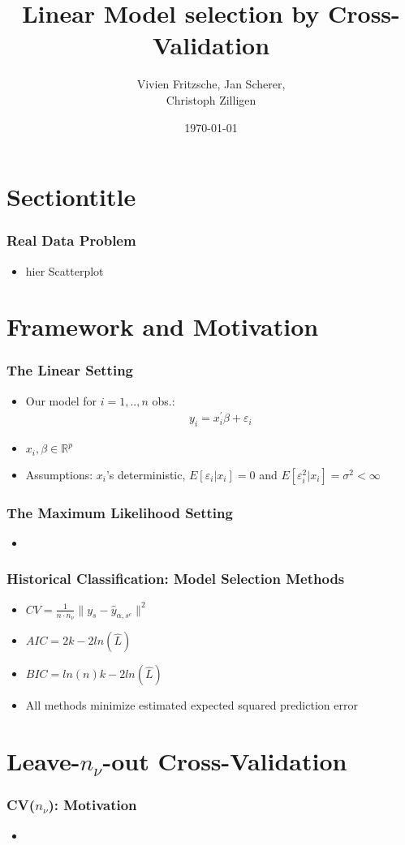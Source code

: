 \documentclass[20pt]{beamer}
\title[Cross Validation]{ Linear Model selection by Cross-Validation}
\author{ Vivien Fritzsche, Jan Scherer, \\ Christoph Zilligen}
\date{\today}
\begin{document}
\beamertemplatenavigationsymbolsempty
\begin{frame}
\titlepage
\end{frame}

\section{Sectiontitle}

\begin{frame}
	\frametitle{Real Data Problem}
	\begin{itemize}
		\item hier Scatterplot
	\end{itemize}
\end{frame}

\section{Framework and Motivation}

\begin{frame}
\frametitle{The Linear Setting}
\begin{itemize}
	\item Our model for $i=1,..,n$ obs.:
	\begin{align*}
		y_i=x_i^\prime\beta+\varepsilon_i
	\end{align*}
	\item $x_i,\beta\in\mathbb{R}^p$
	\item Assumptions:
	$x_i$'s deterministic,
	$E[\varepsilon_i|x_i]=0$ and $E[\varepsilon_i^2|x_i]=\sigma^2<\infty$
\end{itemize}
\end{frame}



\begin{frame}
	\frametitle{The Maximum Likelihood Setting}
	\begin{itemize}
		\item 
	\end{itemize}
\end{frame}

\begin{frame}
	\frametitle{Historical Classification: Model Selection Methods}
	\begin{itemize}
		\item $CV=\frac{1}{n\cdot n_\nu}\parallel y_s-\hat{y}_{\alpha,s^c}\parallel^2$
		\item $AIC=2k-2ln(\hat{L})$
		\item $BIC=ln(n)k-2ln(\hat{L})$
		\item All methods minimize estimated expected squared prediction error
	\end{itemize}
\end{frame}

\section{Leave-$n_\nu$-out Cross-Validation}

\begin{frame}
	\frametitle{CV($n_\nu$): Motivation}
	\begin{itemize}
		\item
	\end{itemize}
\end{frame}
\end{document}
